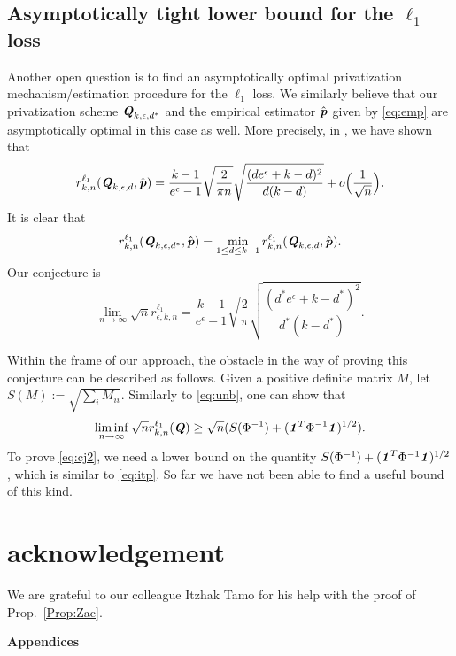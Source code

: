 \documentclass[11pt,onecolumn]{IEEEtran}
\def\mathbi#1{{\textbf{\textit #1}}}
\begin{document}
\subsection{Asymptotically tight lower bound for the $\ell_1$ loss}
Another open question is to find an asymptotically optimal privatization mechanism/estimation procedure
for the $\ell_1$ loss. We similarly believe that our privatization scheme $\mathbi{Q}_{k,\epsilon,d^\ast}$ and the empirical estimator $\hat{\mathbi{p}}$ given by \eqref{eq:emp} are asymptotically optimal in this case as well. 
More precisely, in \cite{Ye17}, we have shown that
$$
r_{k,n}^{\ell_1} (\mathbi{Q}_{k,\epsilon,d}, \hat{\mathbi{p}})
=   \frac{k-1}{e^{\epsilon}-1}  \sqrt{\frac{2}{\pi n}}
\sqrt{\frac{(d e^{\epsilon} + k-d)^2 }{d(k-d)} } + o\Big(\frac 1{\sqrt n}\Big).
$$
It is clear that
$$
r_{k,n}^{\ell_1} (\mathbi{Q}_{k,\epsilon,d^\ast}, \hat{\mathbi{p}}) = 
\min_{1\le d \le k-1} r_{k,n}^{\ell_1} (\mathbi{Q}_{k,\epsilon,d}, \hat{\mathbi{p}}).
$$
Our conjecture is
\begin{equation}\label{eq:cj2}
\lim_{n\to \infty} \sqrt{n} r_{\epsilon,k,n}^{\ell_1}
= \frac{k-1}{e^{\epsilon}-1}  \sqrt{\frac{2}{\pi}}
\sqrt{\frac{(d^\ast e^{\epsilon} + k-d^\ast)^2 }{d^\ast(k-d^\ast)} }.
\end{equation}

Within the frame of our approach, the obstacle in the way of proving this conjecture can be described as follows. Given a positive definite matrix $M$, let $S(M):=\sqrt{\sum_i M_{ii}}.$ %
Similarly to \eqref{eq:unb}, one can show that
$$
\liminf_{n\to \infty} \sqrt{n} r_{k,n}^{\ell_1} (\mathbi{Q}) \ge
\sqrt{n} ( S(\Phi^{-1}) + (\mathbi{1}^T \Phi^{-1} \mathbi{1})^{1/2} ).
$$
To prove \eqref{eq:cj2}, we need a lower bound on the quantity
$ S(\Phi^{-1}) + (\mathbi{1}^T \Phi^{-1} \mathbi{1})^{1/2} $, which is similar to
\eqref{eq:itp}. So far we have not been able to find a useful bound of this kind.



\section*{acknowledgement}

We are grateful to our colleague Itzhak Tamo for his help with the proof of Prop.~\ref{Prop:Zac}.

\clearpage

\begin{center}{\Large\bf Appendices}\end{center}
\end{document}
